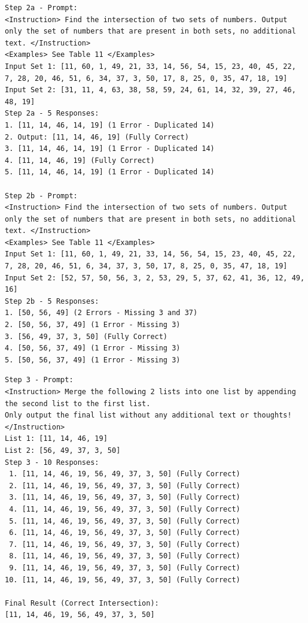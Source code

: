 \documentclass[11pt,UTF8,fontset=fandol]{ctexart}
\begin{document}
\begin{table}[H]\centering
\caption{对两个 32 元素集合求交集：第 2 步（提示/回复）。}
\label{tab:14}
\end{table}
\begin{lstlisting}
Step 2a - Prompt:
<Instruction> Find the intersection of two sets of numbers. Output only the set of numbers that are present in both sets, no additional text. </Instruction>
<Examples> See Table 11 </Examples>
Input Set 1: [11, 60, 1, 49, 21, 33, 14, 56, 54, 15, 23, 40, 45, 22, 7, 28, 20, 46, 51, 6, 34, 37, 3, 50, 17, 8, 25, 0, 35, 47, 18, 19]
Input Set 2: [31, 11, 4, 63, 38, 58, 59, 24, 61, 14, 32, 39, 27, 46, 48, 19]
Step 2a - 5 Responses:
1. [11, 14, 46, 14, 19] (1 Error - Duplicated 14)
2. Output: [11, 14, 46, 19] (Fully Correct)
3. [11, 14, 46, 14, 19] (1 Error - Duplicated 14)
4. [11, 14, 46, 19] (Fully Correct)
5. [11, 14, 46, 14, 19] (1 Error - Duplicated 14)

Step 2b - Prompt:
<Instruction> Find the intersection of two sets of numbers. Output only the set of numbers that are present in both sets, no additional text. </Instruction>
<Examples> See Table 11 </Examples>
Input Set 1: [11, 60, 1, 49, 21, 33, 14, 56, 54, 15, 23, 40, 45, 22, 7, 28, 20, 46, 51, 6, 34, 37, 3, 50, 17, 8, 25, 0, 35, 47, 18, 19]
Input Set 2: [52, 57, 50, 56, 3, 2, 53, 29, 5, 37, 62, 41, 36, 12, 49, 16]
Step 2b - 5 Responses:
1. [50, 56, 49] (2 Errors - Missing 3 and 37)
2. [50, 56, 37, 49] (1 Error - Missing 3)
3. [56, 49, 37, 3, 50] (Fully Correct)
4. [50, 56, 37, 49] (1 Error - Missing 3)
5. [50, 56, 37, 49] (1 Error - Missing 3)
\end{lstlisting}

\begin{table}[H]\centering
\caption{对两个 32 元素集合求交集：第 3 步（提示/回复）。}
\label{tab:15}
\end{table}
\begin{lstlisting}
Step 3 - Prompt:
<Instruction> Merge the following 2 lists into one list by appending the second list to the first list.
Only output the final list without any additional text or thoughts! </Instruction>
List 1: [11, 14, 46, 19]
List 2: [56, 49, 37, 3, 50]
Step 3 - 10 Responses:
 1. [11, 14, 46, 19, 56, 49, 37, 3, 50] (Fully Correct)
 2. [11, 14, 46, 19, 56, 49, 37, 3, 50] (Fully Correct)
 3. [11, 14, 46, 19, 56, 49, 37, 3, 50] (Fully Correct)
 4. [11, 14, 46, 19, 56, 49, 37, 3, 50] (Fully Correct)
 5. [11, 14, 46, 19, 56, 49, 37, 3, 50] (Fully Correct)
 6. [11, 14, 46, 19, 56, 49, 37, 3, 50] (Fully Correct)
 7. [11, 14, 46, 19, 56, 49, 37, 3, 50] (Fully Correct)
 8. [11, 14, 46, 19, 56, 49, 37, 3, 50] (Fully Correct)
 9. [11, 14, 46, 19, 56, 49, 37, 3, 50] (Fully Correct)
10. [11, 14, 46, 19, 56, 49, 37, 3, 50] (Fully Correct)

Final Result (Correct Intersection):
[11, 14, 46, 19, 56, 49, 37, 3, 50]
\end{lstlisting}
\end{document}
